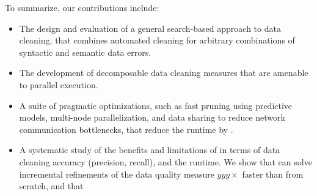 \noindent To summarize, our contributions include:
\begin{itemize}[leftmargin=*, topsep=0mm, itemsep=0mm]
  \item The design and evaluation of a general search-based approach to data cleaning, that combines automated cleaning for arbitrary combinations of syntactic and semantic data errors.
  \item The development of decomposable data cleaning measures that are amenable to parallel execution.
  \item A suite of pragmatic optimizations, such as fast pruning using predictive models, multi-node parallelization, and data sharing to reduce network communication bottlenecks, that reduce the runtime by .
  \item A systematic study of the benefits and limitations of \sys in terms of data cleaning accuracy (precision, recall), and the runtime.  We show that \sys can solve incremental refinements of the data quality measure $yyy\times$ faster than from scratch, and that 

\end{itemize}


